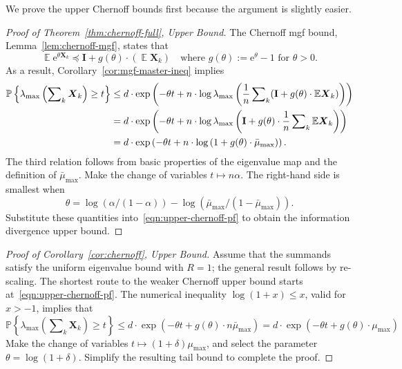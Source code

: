 \documentclass[11pt,letterpaper,twoside,reqno,draft]{amsart}
\theoremstyle{remark}
\numberwithin{equation}{section}
\numberwithin{thm}{section}
\begin{document}
We prove the upper Chernoff bounds first because the argument is slightly easier.

\begin{proof}[Proof of Theorem~\ref{thm:chernoff-full}, Upper Bound]
The Chernoff mgf bound, Lemma~\ref{lem:chernoff-mgf}, states that
$$
{\operatorname{\mathbb{E}}} {\mathrm{e}}^{\theta{\bm{{X}}}_k}
	{\preccurlyeq} {\mathbf{I}} +  g(\theta) \cdot ({\operatorname{\mathbb{E}}} {\bm{{X}}}_k)
	\quad\text{where $g(\theta) := {\mathrm{e}}^{\theta} - 1$ for $\theta > 0$.}
$$
As a result, Corollary~\ref{cor:mgf-master-ineq} implies
\begin{align} \label{eqn:upper-chernoff-pf}
{\mathbb{P}\left\{ {{ \lambda_{\max}\left(\sum\nolimits_k {\bm{{X}}}_k \right) \geq t }} \right\}}
	&\leq d \cdot \exp\left( -\theta t +
	n \cdot \log \lambda_{\max}\left( \frac{1}{n} \sum\nolimits_k ({\mathbf{I}} + g(\theta) \cdot
	{\operatorname{\mathbb{E}}} {\bm{{X}}}_k) \right) \right) \notag \\
	&= d \cdot \exp\left( -\theta t +
	n \cdot \log \lambda_{\max}\left( {\mathbf{I}} + g(\theta) \cdot
	\frac{1}{n} \sum\nolimits_k {\operatorname{\mathbb{E}}} {\bm{{X}}}_k \right) \right) \notag \\
	&= d \cdot \exp\left( -\theta t +
	n \cdot \log\left( 1 + g(\theta) \cdot \bar{\mu}_{\max} \right) \right).
\end{align}
The third relation follows from basic properties of the eigenvalue map and the definition of $\bar{\mu}_{\max}$.
Make the change of variables $t \mapsto n \alpha$.  The right-hand side is smallest when
$$
\theta = \log(\alpha / (1 - \alpha)) - \log(\bar{\mu}_{\max}/(1-\bar{\mu}_{\max})).
$$
Substitute these quantities into~\eqref{eqn:upper-chernoff-pf} to obtain the information divergence upper bound.
\end{proof}

\begin{proof}[Proof of Corollary~\ref{cor:chernoff}, Upper Bound]
Assume that the summands satisfy the uniform eigenvalue bound with $R = 1$; the general result follows by re-scaling.  The shortest route to the weaker Chernoff upper bound starts at~\eqref{eqn:upper-chernoff-pf}.  The numerical inequality $\log(1 + x) \leq x$, valid for $x > -1$, implies that 
$$
{\mathbb{P}\left\{ {{ \lambda_{\max}\left(\sum\nolimits_k {\bm{{X}}}_k \right) \geq t}} \right\}}
	\leq d \cdot \exp\left( -\theta t +
	g(\theta) \cdot n \bar{\mu}_{\max} \right)
	= d \cdot \exp\left( -\theta t +
	g(\theta) \cdot \mu_{\max} \right)
$$
Make the change of variables $t \mapsto (1+\delta) \mu_{\max}$, and select the parameter $\theta = \log(1 + \delta)$.  Simplify the resulting tail bound to complete the proof. 
\end{proof}
\end{document}
